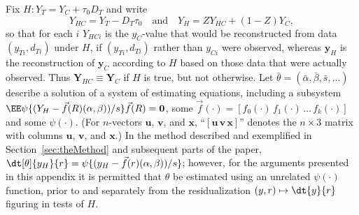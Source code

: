 
Fix $H: Y_T = Y_C + \tau_0 D_T$ and write
\begin{equation}
  \label{eq:yhc}
  {Y}_{HC} = {Y}_{T} - {D}_{T}\tau_{0}\quad
  \text{and}  \quad Y_{H} = ZY_{HC} + (1-Z)Y_{C},
\end{equation}
 so that for each $i$  ${Y}_{HC i}$ is the  $y_{C}$-value that would be
 reconstructed from data $(y_{Ti}, d_{Ti})$ under $H$, if $(y_{Ti},
 d_{Ti})$ rather than $y_{Ci}$ were observed, whereas $\mathbf{y}_{H}$ is the reconstruction of $\mathbf{y}_{C}$
 according to $H$ based on those data that were actually observed.  Thus $\mathbf{Y}_{HC} \equiv \mathbf{Y}_{C}$ if $H$ is true, but not otherwise. 
Let $\bar\theta = (\bar\alpha, \bar\beta, \bar{s}, \ldots)$
describe a solution of a system of estimating equations, including a
subsystem $\EE \psi\{ (Y_{H} -
\vec{f}(R) (\alpha, \beta))/s\}\vec{f}(R) =
\mathbf{0}$, some $\vec{f}(\cdot) = [f_{0}(\cdot)\, f_{1}(\cdot)\, \ldots\,
f_{k}(\cdot)]$ and some $\psi(\cdot)$.  (For $n$-vectors $\mathbf{u}$, $\mathbf{v}$, and $\mathbf{x}$,
``$[\mathbf{u}\, \mathbf{v}\, \mathbf{x}]$'' denotes the $n\times 3$ matrix with
columns $\mathbf{u}$, $\mathbf{v}$, and $\mathbf{x}$.)  In the method
described and exemplified in Section~\ref{sec:theMethod} and
subsequent parts of the paper, $\dt[\theta]{y_{H} }{ r} = \psi\{ (y_{H} -
\vec{f}(r) (\alpha, \beta))/s\}$; however, for the arguments presented in
this appendix it is permitted that $\theta$ be estimated using an
unrelated $\psi(\cdot)$ function, prior to and
separately from the residualization $(y,r) \mapsto \dt{y }{ r}$ figuring in tests of $H$.

